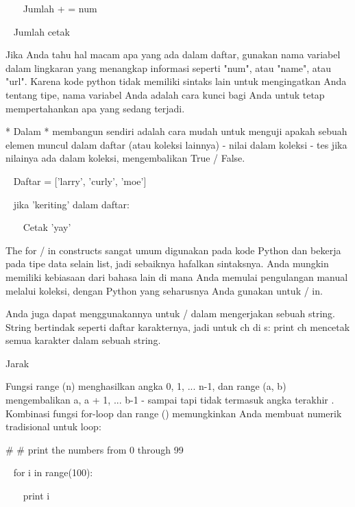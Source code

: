 ~~~ Jumlah + = num \par
~ Jumlah cetak \par
\vspace{12pt}
Jika Anda tahu hal macam apa yang ada dalam daftar, gunakan nama variabel dalam lingkaran yang menangkap informasi seperti "num", atau "name", atau "url". Karena kode python tidak memiliki sintaks lain untuk mengingatkan Anda tentang tipe, nama variabel Anda adalah cara kunci bagi Anda untuk tetap mempertahankan apa yang sedang terjadi. \par
\vspace{12pt}
* Dalam * membangun sendiri adalah cara mudah untuk menguji apakah sebuah elemen muncul dalam daftar (atau koleksi lainnya) - nilai dalam koleksi - tes jika nilainya ada dalam koleksi, mengembalikan True / False. \par
\vspace{12pt}
~ Daftar = ['larry', 'curly', 'moe'] \par
~ jika 'keriting' dalam daftar: \par
~~~ Cetak 'yay' \par
\vspace{12pt}
The for / in constructs sangat umum digunakan pada kode Python dan bekerja pada tipe data selain list, jadi sebaiknya hafalkan sintaksnya. Anda mungkin memiliki kebiasaan dari bahasa lain di mana Anda memulai pengulangan manual melalui koleksi, dengan Python yang seharusnya Anda gunakan untuk / in. \par
\vspace{12pt}
Anda juga dapat menggunakannya untuk / dalam mengerjakan sebuah string. String bertindak seperti daftar karakternya, jadi untuk ch di s: print ch mencetak semua karakter dalam sebuah string. \par
Jarak \par
\vspace{12pt}
Fungsi range (n) menghasilkan angka 0, 1, ... n-1, dan range (a, b) mengembalikan a, a + 1, ... b-1 - sampai tapi tidak termasuk angka terakhir . Kombinasi fungsi for-loop dan range () memungkinkan Anda membuat numerik tradisional untuk loop: \par
\vspace{12pt}
\vspace{12pt}
   \#     \#   print the numbers from 0 through 99 \par
~ for i in range(100): \par
~~~ print i \par
\vspace{12pt}
